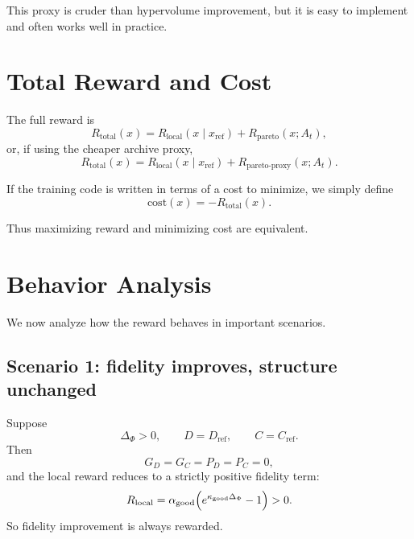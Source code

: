 \documentclass[11pt]{article}
\begin{document}
This proxy is cruder than hypervolume improvement, but it is easy to implement and often works well in practice.

\section{Total Reward and Cost}

The full reward is
\begin{equation}
    R_{\mathrm{total}}(x)
    =
    R_{\mathrm{local}}(x\mid x_{\mathrm{ref}})
    +
    R_{\mathrm{pareto}}(x;A_t),
\label{eq:Rtotal}
\end{equation}
or, if using the cheaper archive proxy,
\begin{equation}
    R_{\mathrm{total}}(x)
    =
    R_{\mathrm{local}}(x\mid x_{\mathrm{ref}})
    +
    R_{\mathrm{pareto\text{-}proxy}}(x;A_t).
\end{equation}

If the training code is written in terms of a cost to minimize, we simply define
\begin{equation}
    \mathrm{cost}(x) = -R_{\mathrm{total}}(x).
\label{eq:cost}
\end{equation}

Thus maximizing reward and minimizing cost are equivalent.

\section{Behavior Analysis}

We now analyze how the reward behaves in important scenarios.

\subsection{Scenario 1: fidelity improves, structure unchanged}

Suppose
\begin{equation}
    \Delta_{\Phi}>0,
    \qquad
    D=D_{\mathrm{ref}},
    \qquad
    C=C_{\mathrm{ref}}.
\end{equation}
Then
\begin{equation}
    G_D=G_C=P_D=P_C=0,
\end{equation}
and the local reward reduces to a strictly positive fidelity term:
\begin{equation}
    R_{\mathrm{local}}=
    \alpha_{\mathrm{good}}\Bigl(e^{\kappa_{\mathrm{good}}\Delta_{\Phi}}-1\Bigr)>0.
\end{equation}
So fidelity improvement is always rewarded.
\end{document}
